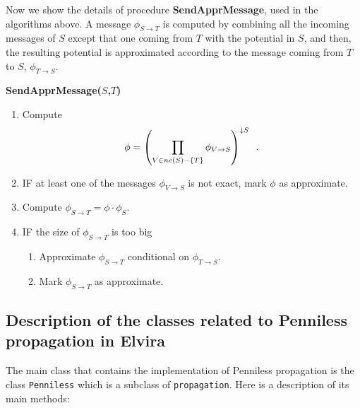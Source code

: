 Now we show the details of procedure {\bf SendApprMessage}, used in the
algorithms above. A message $\phi_{S\rightarrow T}$ is computed by
combining all the incoming messages of $S$ except that one coming
from $T$ with the potential in $S$, and then, the resulting potential is
approximated according to the message coming from $T$ to
$S$, $\phi_{T\rightarrow S}$.

\bigskip\noindent
\textsf{\textbf{SendApprMessage($S$,$T$)}}

\begin{enumerate}
\item Compute
  $$
  \phi = \left(
    \prod_{V\in ne(S)-{\{T\}}}\phi_{V\rightarrow S}
  \right)^{\downarrow S} \enspace .
  $$
\item IF at least one of the messages $\phi_{V\rightarrow S}$ is not
  exact, mark $\phi$ as approximate.
\item Compute $\phi_{S\rightarrow T} = \phi \cdot \phi_S$.
\item IF the size of $\phi_{S\rightarrow T}$ is too big
  \begin{enumerate}
  \item Approximate $\phi_{S\rightarrow T}$ conditional on
    $\phi_{T\rightarrow S}$.
  \item Mark $\phi_{S\rightarrow T}$ as approximate.
  \end{enumerate}
\end{enumerate}


\subsection{Description of the classes related to Penniless
  propagation in Elvira}

The main class that contains the implementation of Penniless
propagation is the class \texttt{Penniless} which is a subclass of
\texttt{propagation}. Here is a description of its main methods:

